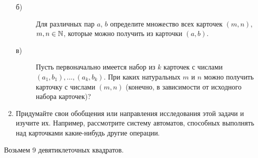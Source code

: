 \begin{enumerate}
\begin{description}
    \item [б) ]Для различных пар $a$, $b$ определите множество всех карточек $(m, n)$, $m, n \in \mathbb{N}$, которые можно получить из карточки $(a, b)$.
    \item [в) ]Пусть первоначально имеется набор из $k$ карточек с числами $(a_1,b_1),...,(a_k, b_k)$. При каких натуральных $m$ и $n$ можно получить карточку с числами $(m, n)$ (конечно, в зависимости от исходного набора карточек)?
    \end{description}
\item Придумайте свои обобщения или направления исследования этой задачи и изучите их. Например, рассмотрите систему автоматов, способных выполнять над карточками какие-нибудь другие операции.
\end{enumerate}

Возьмем 9 девятиклеточных квадратов.

